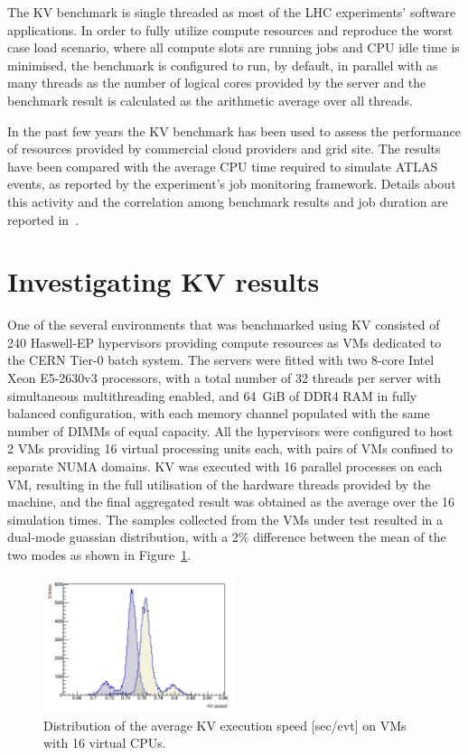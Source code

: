 The KV benchmark is single threaded as most of the LHC experiments'
software applications. In order to fully utilize compute resources and reproduce
the worst case load scenario, where all compute slots are running jobs and
CPU idle time is minimised, the benchmark is configured to run,
by default, in parallel with as many threads as the number of logical cores 
provided by the server and the benchmark result is calculated as the arithmetic 
average over all threads.

In the past few years the KV benchmark has been used to assess the performance of
resources provided by commercial cloud providers and grid site. The results 
have been compared with the average CPU time required to simulate ATLAS events, 
as reported by the experiment's job monitoring framework. Details about this activity 
and the correlation among benchmark results and job duration are reported 
in~\cite{bmk}.


\section{Investigating KV results}
One of the several environments that was benchmarked using KV consisted of
 240 Haswell-EP hypervisors providing compute
resources as VMs dedicated to the CERN Tier-0 batch system. The servers were
fitted with two 8-core Intel Xeon E5-2630v3 processors, with a total number  
of 32 threads per server with simultaneous multithreading enabled, and 64~GiB    
of DDR4 RAM in fully balanced configuration, with each memory channel populated with
the same number of DIMMs of equal capacity. All the hypervisors were configured 
to host 2 VMs providing 16 virtual processing units each, with pairs of VMs 
confined to separate NUMA domains. KV was executed with 16 parallel processes 
on each VM, resulting in the full utilisation of the hardware threads provided
by the machine, and the final aggregated result was obtained as the average over 
the 16 simulation times. The samples collected from the VMs under test resulted in a dual-mode guassian 
distribution, with a 2\% difference between the 
mean of the two modes as shown in Figure~\ref{dual-mode-gaussian}.


\begin{figure}[ht]
\begin{center}
\includegraphics[width=0.5\textwidth]{images/dual-mode-gaussian.png}
\end{center}
\caption{\label{dual-mode-gaussian} Distribution of the average KV execution speed [sec/evt] on  VMs with 16 virtual CPUs. }
\end{figure}


